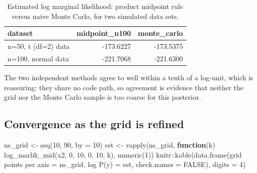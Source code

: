 \documentclass[
  letterpaper,
  DIV=11,
  numbers=noendperiod]{scrreprt}
\newenvironment{Shaded}{\begin{snugshade}}{\end{snugshade}}
\newcommand{\AttributeTok}[1]{\textcolor[rgb]{0.40,0.45,0.13}{#1}}
\newcommand{\ConstantTok}[1]{\textcolor[rgb]{0.56,0.35,0.01}{#1}}
\newcommand{\ControlFlowTok}[1]{\textcolor[rgb]{0.00,0.23,0.31}{\textbf{#1}}}
\newcommand{\DecValTok}[1]{\textcolor[rgb]{0.68,0.00,0.00}{#1}}
\newcommand{\FunctionTok}[1]{\textcolor[rgb]{0.28,0.35,0.67}{#1}}
\newcommand{\NormalTok}[1]{\textcolor[rgb]{0.00,0.23,0.31}{#1}}
\newcommand{\OtherTok}[1]{\textcolor[rgb]{0.00,0.23,0.31}{#1}}
\newcommand{\SpecialCharTok}[1]{\textcolor[rgb]{0.37,0.37,0.37}{#1}}
\newcommand{\StringTok}[1]{\textcolor[rgb]{0.13,0.47,0.30}{#1}}
\begin{document}
{

\begin{longtable}[]{@{}lrr@{}}

\caption{\label{tbl-quad-vs-mc}Estimated log marginal likelihood:
product midpoint rule versus naive Monte Carlo, for two simulated data
sets.}

\tabularnewline

\toprule\noalign{}
dataset & midpoint\_n100 & monte\_carlo \\
\midrule\noalign{}
\endhead
\bottomrule\noalign{}
\endlastfoot
n=50, t (df=2) data & -173.6227 & -173.5375 \\
n=100, normal data & -221.7068 & -221.6300 \\

\end{longtable}

}

The two independent methods agree to well within a tenth of a log-unit,
which is reassuring: they share no code path, so agreement is evidence
that neither the grid nor the Monte Carlo sample is too coarse for this
posterior.

\subsection{Convergence as the grid is
refined}\label{convergence-as-the-grid-is-refined}

\begin{Shaded}
\begin{Highlighting}[]
\NormalTok{ns\_grid }\OtherTok{\textless{}{-}} \FunctionTok{seq}\NormalTok{(}\DecValTok{10}\NormalTok{, }\DecValTok{90}\NormalTok{, }\AttributeTok{by =} \DecValTok{10}\NormalTok{)}
\NormalTok{est }\OtherTok{\textless{}{-}} \FunctionTok{vapply}\NormalTok{(ns\_grid, }\ControlFlowTok{function}\NormalTok{(k) }\FunctionTok{log\_marlik\_mid}\NormalTok{(x2, }\DecValTok{0}\NormalTok{, }\DecValTok{10}\NormalTok{, }\DecValTok{0}\NormalTok{, }\DecValTok{10}\NormalTok{, k), }\FunctionTok{numeric}\NormalTok{(}\DecValTok{1}\NormalTok{))}
\NormalTok{knitr}\SpecialCharTok{::}\FunctionTok{kable}\NormalTok{(}\FunctionTok{data.frame}\NormalTok{(}\StringTok{\textasciigrave{}}\AttributeTok{grid points per axis}\StringTok{\textasciigrave{}} \OtherTok{=}\NormalTok{ ns\_grid, }\StringTok{\textasciigrave{}}\AttributeTok{log P(y)}\StringTok{\textasciigrave{}} \OtherTok{=}\NormalTok{ est,}
                         \AttributeTok{check.names =} \ConstantTok{FALSE}\NormalTok{), }\AttributeTok{digits =} \DecValTok{4}\NormalTok{)}
\end{Highlighting}
\end{Shaded}
\end{document}
